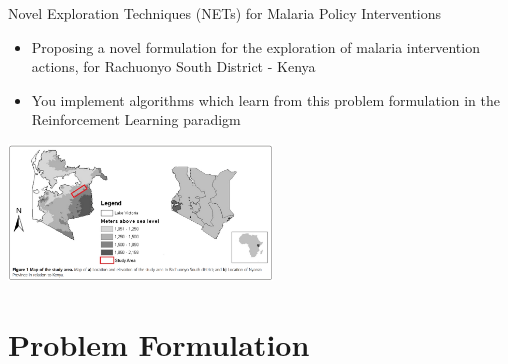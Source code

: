 \documentclass[10pt,usenames,dvipsnames]{beamer}
\begin{document}

\begin{frame}{Novel Exploration Techniques (NETs) for Malaria Policy Interventions}

\begin{itemize}
\item Proposing a novel formulation for the exploration of malaria intervention actions, for Rachuonyo South District - Kenya 
\item You implement algorithms which learn from this problem formulation in the Reinforcement Learning paradigm
\end{itemize}
\centering
         \includegraphics[width=7cm]{images/WesternKenya.png} 
\end{frame}



\section{Problem Formulation}
\end{document}
